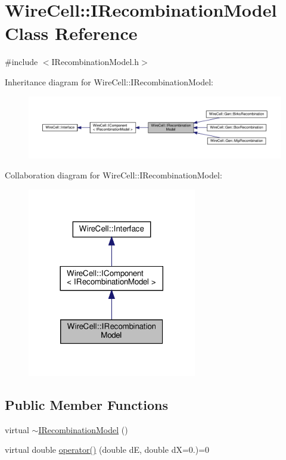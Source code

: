 \hypertarget{class_wire_cell_1_1_i_recombination_model}{}\section{Wire\+Cell\+:\+:I\+Recombination\+Model Class Reference}
\label{class_wire_cell_1_1_i_recombination_model}


{\ttfamily \#include $<$I\+Recombination\+Model.\+h$>$}



Inheritance diagram for Wire\+Cell\+:\+:I\+Recombination\+Model\+:
\nopagebreak
\begin{figure}[H]
\begin{center}
\leavevmode
\includegraphics[width=350pt]{class_wire_cell_1_1_i_recombination_model__inherit__graph}
\end{center}
\end{figure}


Collaboration diagram for Wire\+Cell\+:\+:I\+Recombination\+Model\+:
\nopagebreak
\begin{figure}[H]
\begin{center}
\leavevmode
\includegraphics[width=209pt]{class_wire_cell_1_1_i_recombination_model__coll__graph}
\end{center}
\end{figure}
\subsection*{Public Member Functions}
\begin{DoxyCompactItemize}
\item 
virtual \hyperlink{class_wire_cell_1_1_i_recombination_model_aaf339ace2e97caa89995db39ab5a6953}{$\sim$\+I\+Recombination\+Model} ()
\item 
virtual double \hyperlink{class_wire_cell_1_1_i_recombination_model_a600558009b672e93219962f364829e00}{operator()} (double dE, double dX=0.)=0
\end{DoxyCompactItemize}
